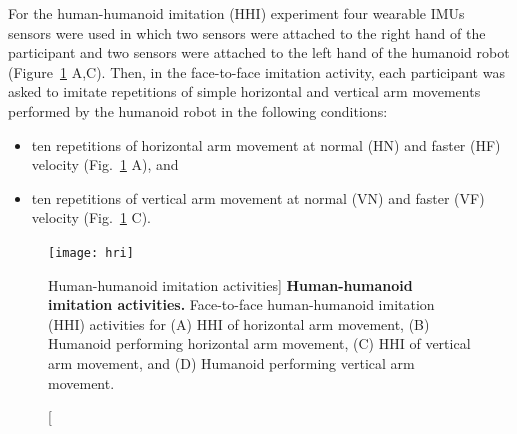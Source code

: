 For the human-humanoid imitation (HHI) experiment four wearable IMUs sensors 
were used in which two sensors were attached to the right hand of 
the participant and two sensors were attached to the left hand of 
the humanoid robot (Figure~\ref{fig:hri} A,C).
Then, in the face-to-face imitation activity, each participant was asked 
to imitate repetitions of simple horizontal and vertical arm movements 
performed by the humanoid robot in the following conditions:
\begin{itemize}[noitemsep,topsep=0pt]
\item ten repetitions of horizontal arm movement at normal (HN) and faster (HF) 
velocity (Fig.~\ref{fig:hri} A), and
\item ten repetitions of vertical arm movement at normal (VN) and faster (VF) 
velocity (Fig.~\ref{fig:hri} C).
\end{itemize}
\begin{figure}
  \centering
  \texttt{[image: hri]}
    \caption
	[Human-humanoid imitation activities]{
	{\bf Human-humanoid imitation activities.} 
		Face-to-face human-humanoid imitation (HHI) activities for 
		(A) HHI of horizontal arm movement, 
		(B) Humanoid performing horizontal arm movement,
		(C) HHI of vertical arm movement, and 
		(D) Humanoid performing vertical arm movement.
        }
    \label{fig:hri}
\end{figure}

